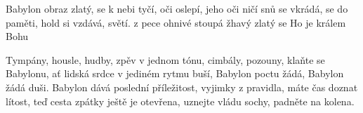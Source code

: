 \begin{TEXT}{Babylon}
\SLOKA {} obraz zlatý,  se k nebi tyčí,\NL
{} oči oslepí,  jeho oči ničí \NL
{} snů se vkrádá,  se do paměti,\NL
{} hold si vzdává,   světí.
\REFREN  {} z pece ohnivé  stoupá žhavý \NL
{} zlatý  se \NL
Ho  je králem \NL
{} Bohu   

\SLOKA Tympány, housle, hudby, zpěv v jednom tónu,\NL
cimbály, pozouny, klaňte se Babylonu,\NL
ať lidská srdce v jediném rytmu buší,\NL
Babylon poctu žádá, Babylon žádá duši.
\REFRENHRAJ
\SLOKA Babylon dává poslední příležitost,\NL
vyjimky z pravidla, máte čas doznat lítost,\NL
teď cesta zpátky ještě je otevřena, \NL
uznejte vládu sochy, padněte na kolena.
\REFRENHRAJ
\end{TEXT}
